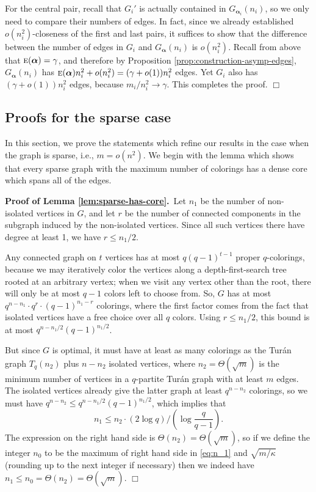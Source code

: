 \documentclass[11pt]{article}
\newcommand{\ec}{\text{\sc e}}
\newcommand{\blpha}{{\boldsymbol\alpha}}
\begin{document}
For the central pair, recall that $G_i'$ is actually contained in
$G_{\blpha_i}(n_i)$, so we only need to compare their numbers of
edges.  In fact, since we already established $o(n_i^2)$-closeness of
the first and last pairs, it suffices to show that the difference
between the number of edges in $G_i$ and $G_\blpha(n_i)$ is
$o(n_i^2)$.  Recall from above that $\ec(\blpha) = \gamma$, and
therefore by Proposition \ref{prop:construction-asymp-edges},
$G_\blpha(n_i)$ has $\ec(\blpha)n_i^2 + o(n_i^2) = (\gamma + o(1))
n_i^2$ edges.  Yet $G_i$ also has $(\gamma+o(1)) n_i^2$ edges, because
$m_i/n_i^2 \rightarrow \gamma$.  This completes the proof. \hfill
$\Box$


\subsection{Proofs for the sparse case}
\label{sec:sparse-proofs}

In this section, we prove the statements which refine our results in
the case when the graph is sparse, i.e., $m = o(n^2)$.  We begin with
the lemma which shows that every sparse graph with the maximum number
of colorings has a dense core which spans all of the edges.

\vspace{3mm}

\noindent \textbf{Proof of Lemma \ref{lem:sparse-has-core}.}\, Let
$n_1$ be the number of non-isolated vertices in $G$, and let $r$ be
the number of connected components in the subgraph induced by the
non-isolated vertices.  Since all such vertices there have degree at
least 1, we have $r \leq n_1/2$.

Any connected graph on $t$ vertices has at most $q (q-1)^{t-1}$ proper
$q$-colorings, because we may iteratively color the vertices along a
depth-first-search tree rooted at an arbitrary vertex; when we visit
any vertex other than the root, there will only be at most $q-1$
colors left to choose from.  So, $G$ has at most $q^{n-n_1} \cdot q^r
\cdot (q-1)^{n_1-r}$ colorings, where the first factor comes from the
fact that isolated vertices have a free choice over all $q$ colors.
Using $r \leq n_1/2$, this bound is at most $q^{n-n_1/2}
(q-1)^{n_1/2}$.

But since $G$ is optimal, it must have at least as many colorings as
the Tur\'an graph $T_q(n_2)$ plus $n-n_2$ isolated vertices, where
$n_2 = \Theta(\sqrt{m})$ is the minimum number of vertices in a
$q$-partite Tur\'an graph with at least $m$ edges.  The isolated
vertices already give the latter graph at least $q^{n-n_2}$ colorings,
so we must have $q^{n-n_2} \leq q^{n-n_1/2} (q-1)^{n_1/2}$, which
implies that
\begin{equation}
  \label{eq:n_1}
  n_1 \leq n_2 \cdot (2 \log q) / \left(\log \frac{q}{q-1}\right) .
\end{equation}
The expression on the right hand side is $\Theta(n_2) =
\Theta(\sqrt{m})$, so if we define the integer $n_0$ to be the maximum
of right hand side in \eqref{eq:n_1} and $\sqrt{m/\kappa}$ (rounding up
to the next integer if necessary) then we indeed have $n_1 \leq n_0 =
\Theta(n_2) = \Theta(\sqrt{m})$.  \hfill $\Box$
\end{document}
